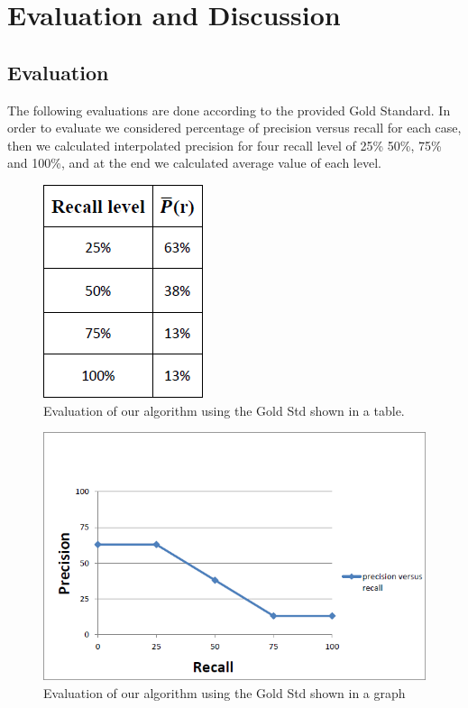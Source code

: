 \chapter{Evaluation and Discussion}
\section{Evaluation}
The following evaluations are done according to the provided Gold Standard. In order to evaluate we considered percentage of precision versus recall for each case, then we calculated interpolated precision for four recall level of  25\% 50\%, 75\% and 100\%, and at the end we calculated average value of each level.

\begin{figure}[h]
\caption{Evaluation of our algorithm using the Gold Std shown in a table.}
\centering
\includegraphics{evaluation_and_discussion/EvalGroup4.png}
\end{figure}

\begin{figure}[h]
\caption{Evaluation of our algorithm using the Gold Std shown in a graph}
\centering
\includegraphics[scale=0.75]{evaluation_and_discussion/EvalGroup4Graph.png}
\end{figure}

